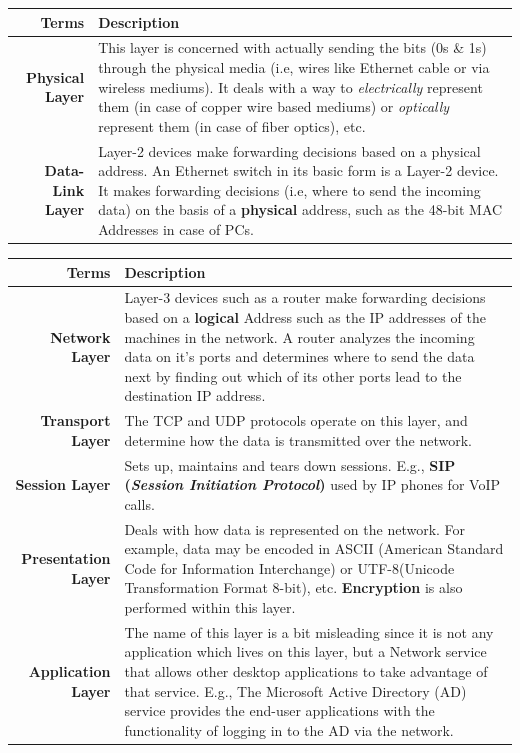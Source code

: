 \noindent
\begin{tabular}{rM{0.75}}
	\toprule
	\textbf{Terms} &\textbf{Description} \\
	\midrule
	\textbf{Physical Layer}	&This layer is concerned with actually sending the bits (0s \& 1s) through the physical media (i.e, wires like Ethernet cable or via wireless mediums). It deals with a way to \textit{electrically} represent them (in case of copper wire based mediums) or \textit{optically} represent them (in case of fiber optics), etc. \\
	\midrule
	\textbf{Data-Link Layer}	&Layer-2 devices make forwarding decisions based on a physical address. An Ethernet switch in its basic form is a Layer-2 device. It makes forwarding decisions (i.e, where to send the incoming data) on the basis of a \textbf{physical} address, such as the 48-bit MAC Addresses in case of PCs.\\
	\bottomrule
\end{tabular}

\noindent
\begin{tabular}{rM{0.71}}
	\toprule
	\textbf{Terms} &\textbf{Description} \\
	\midrule
	\textbf{Network Layer}	&Layer-3 devices such as a router make forwarding decisions based on a \textbf{logical} Address such as the IP addresses of the machines in the network. A router analyzes the incoming data on it's ports and determines where to send the data next by finding out which of its other ports lead to the destination IP address.\\
	\midrule
	\textbf{Transport Layer}	&The TCP and UDP protocols operate on this layer, and determine how the data is transmitted over the network.\\
	\midrule
	\textbf{Session Layer}	&Sets up, maintains and tears down sessions. E.g., \textbf{SIP (\textit{Session Initiation Protocol})} used by IP phones for VoIP calls. \\
	\midrule
	\textbf{Presentation Layer}	&Deals with how data is represented on the network. For example, data may be encoded in ASCII (American Standard Code for Information Interchange) or UTF-8(Unicode Transformation Format 8-bit), etc. \textbf{Encryption} is also performed within this layer.\\
	\midrule
	\textbf{Application Layer}	&The name of this layer is a bit misleading since it is not any application which lives on this layer, but a Network service that allows other desktop applications to take advantage of that service. E.g., The Microsoft Active Directory (AD) service provides the end-user applications with the functionality of logging in to the AD via the network.\\
	\bottomrule
\end{tabular}

